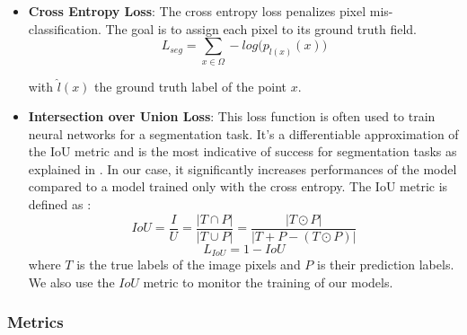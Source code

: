 \documentclass[runningheads]{llncs}
\begin{document}
\begin{itemize}
\item \textbf{Cross Entropy Loss}: The cross entropy loss penalizes pixel mis-classification. The goal is to assign each pixel to  its ground truth field.
\begin{equation}
    L_{seg} = \sum_{x\in \Omega } -log\big (p_{\hat l(x)}(x)\big )
    \label{eq7}
\end{equation}

with $\hat l(x)$ the ground truth label of the point $x$.\\

\item \textbf{Intersection over Union Loss}: This loss function is often used to train neural networks for a segmentation task. It's a differentiable approximation of the IoU metric and is the most indicative of success for segmentation tasks as explained in \cite{IoU}. In our case, it significantly increases performances of the model compared to a model trained only with the cross entropy. The IoU metric is defined as : \\
\begin{equation}
    IoU = \frac{I}{U} = \frac{|T\cap P|}{|T\cup P|} = \frac{|T\odot P|}{|T+P-(T\odot P)|} 
    \label{eq8}
\end{equation}
\begin{equation}
   L_{IoU} = 1 - IoU 
    \label{eq9}
\end{equation}
where $T$ is the true labels of the image pixels and $P$ is their prediction labels. We also use the $IoU$ metric \iffalse in the callback \fi to monitor the training of our models.
\end{itemize}

\subsubsection{Metrics}\hfill
\end{document}
